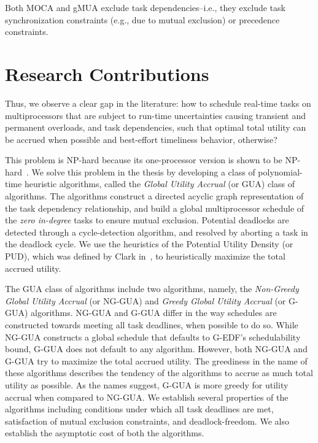 \documentclass[12pt,dvips]{report}
\begin{document}
Both MOCA and gMUA exclude task dependencies--i.e., they exclude task synchronization constraints (e.g., due to mutual exclusion) or precedence constraints.

\section{Research Contributions}

Thus, we observe a clear gap in the literature: how to schedule real-time tasks on multiprocessors that are subject to run-time uncertainties causing transient and permanent overloads, and task dependencies,  such that optimal total utility can be accrued when possible and best-effort timeliness behavior, otherwise? 

This problem is NP-hard because its one-processor version is shown to be NP-hard~\cite{DASA}. We solve this problem in the thesis by developing a class of polynomial-time heuristic algorithms, called the \textit{Global Utility Accrual} (or GUA) class of algorithms. The algorithms construct a directed acyclic graph representation of the task dependency relationship, and build a global multiprocessor schedule of the \textit{zero in-degree} tasks to ensure mutual exclusion. Potential deadlocks are detected through a cycle-detection algorithm, and resolved by aborting a task in the deadlock cycle. We use the heuristics of the Potential Utility Density (or PUD), which was defined by Clark in~\cite{DASA}, to heuristically maximize the total accrued utility.

The GUA class of algorithms include two algorithms, namely, the \textit{Non-Greedy Global Utility Accrual} (or NG-GUA) and \textit{Greedy Global Utility Accrual} (or G-GUA) algorithms. NG-GUA and G-GUA differ in the way schedules are constructed towards meeting all task deadlines, when possible to do so. While NG-GUA constructs a global schedule that defaults to G-EDF's schedulability bound, G-GUA does not default to any algorithm. However, both NG-GUA and G-GUA try to maximize the total accrued utility. The greediness in the name of these algorithms describes the tendency of the algorithms to accrue as much total utility as possible. As the names suggest, G-GUA is more greedy for utility accrual when compared to NG-GUA. We establish several properties of the algorithms including conditions under which all task deadlines are met, satisfaction of mutual exclusion constraints, and deadlock-freedom. We also establish the asymptotic cost of both the algorithms.
\end{document}
